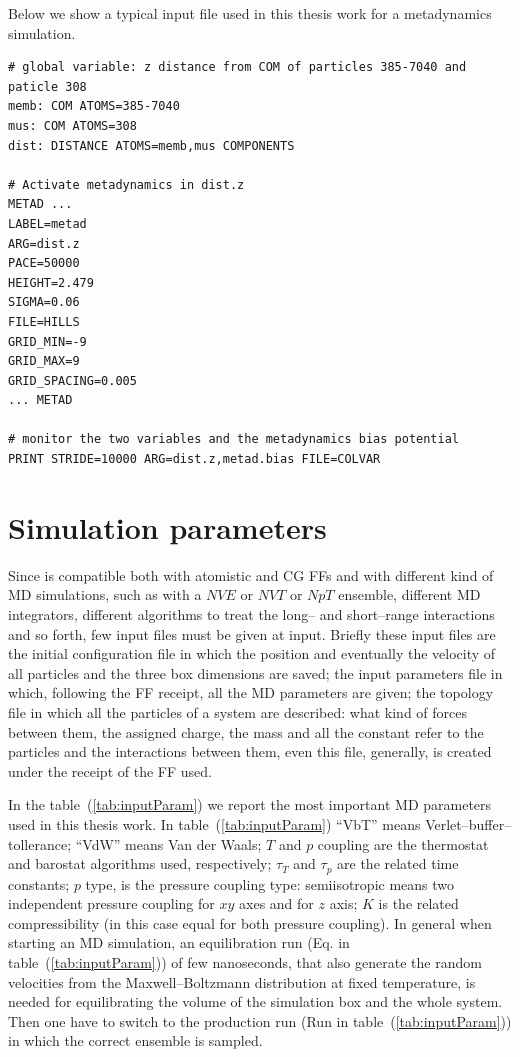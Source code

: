 Below we show a typical input file used in this thesis work for a metadynamics simulation.
\begin{Verbatim}[fontsize=\scriptsize,xleftmargin=1cm]
# global variable: z distance from COM of particles 385-7040 and paticle 308 
memb: COM ATOMS=385-7040
mus: COM ATOMS=308
dist: DISTANCE ATOMS=memb,mus COMPONENTS

# Activate metadynamics in dist.z
METAD ...
LABEL=metad
ARG=dist.z 
PACE=50000
HEIGHT=2.479
SIGMA=0.06
FILE=HILLS
GRID_MIN=-9
GRID_MAX=9
GRID_SPACING=0.005
... METAD

# monitor the two variables and the metadynamics bias potential
PRINT STRIDE=10000 ARG=dist.z,metad.bias FILE=COLVAR
\end{Verbatim}

\section{Simulation parameters}
Since \gromacs is compatible both with atomistic and \ac{CG} \acp{FF} and with different kind of \ac{MD} simulations, such as with a $NVE$ or $NVT$ or $NpT$ ensemble, different \ac{MD} integrators, different algorithms to treat the long-- and short--range interactions and so forth, few input files must be given at \gromacs input. Briefly these input files are the initial configuration file in which the position and eventually the velocity of all particles and the three box dimensions are saved; the input parameters file in which, following the \ac{FF} receipt, all the \ac{MD} parameters are given; the topology file in which all the particles of a system are described: what kind of forces between them, the assigned charge, the mass and all the constant refer to the particles and the interactions between them, even this file, generally, is created under the receipt of the \ac{FF} used.

In the table~(\ref{tab:inputParam}) we report the most important \ac{MD} parameters used in this thesis work. In table~(\ref{tab:inputParam}) ``VbT'' means Verlet--buffer--tollerance; ``VdW'' means Van der Waals; $T$ and $p$ coupling are the thermostat and barostat algorithms used, respectively; $\tau_T$ and $\tau_p$ are the related time constants; $p$ type, is the pressure coupling type: semiisotropic means two independent pressure coupling for $xy$ axes and for $z$ axis; $K$ is the related compressibility (in this case equal for both pressure coupling). In general when starting an \ac{MD} simulation, an equilibration run (Eq. in table~(\ref{tab:inputParam})) of few nanoseconds, that also generate the random velocities from the Maxwell–Boltzmann distribution at fixed temperature, is needed for equilibrating the volume of the simulation box and the whole system. Then one have to switch to the production run (Run in table~(\ref{tab:inputParam})) in which the correct ensemble is sampled. 

